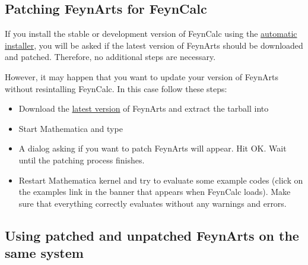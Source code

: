 \documentclass[../FeynCalcManual.tex]{subfiles}
\begin{document}
\subsection{Patching FeynArts for
FeynCalc}\label{patching-feynarts-for-feyncalc}

If you install the stable or development version of FeynCalc using the
\href{https://github.com/FeynCalc/feyncalc/wiki/Installation}{automatic
installer}, you will be asked if the latest version of FeynArts should
be downloaded and patched. Therefore, no additional steps are necessary.

However, it may happen that you want to update your version of FeynArts
without resintalling FeynCalc. In this case follow these steps:

\begin{itemize}
\item
  Download the \href{http://www.feynarts.de/}{latest version} of
  FeynArts and extract the tarball into

\begin{Shaded}
\begin{Highlighting}[]
\OperatorTok{[}\OperatorTok{]}
\end{Highlighting}
\end{Shaded}
\item
  Start Mathematica and type

\begin{Shaded}
\begin{Highlighting}[]
\ExtensionTok{=} \NormalTok{;}
\end{Highlighting}
\end{Shaded}
\item
  A dialog asking if you want to patch FeynArts will appear. Hit OK.
  Wait until the patching process finishes.
\item
  Restart Mathematica kernel and try to evaluate some example codes
  (click on the examples link in the banner that appears when FeynCalc
  loads). Make sure that everything correctly evaluates without any
  warnings and errors.
\end{itemize}

\subsection{Using patched and unpatched FeynArts on the same
system}\label{using-patched-and-unpatched-feynarts-on-the-same-system}
\end{document}
